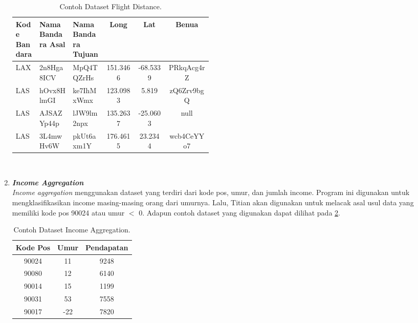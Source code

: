\begin{enumerate}
            \begin{longtable}{|p{0.12\linewidth}|p{0.17\linewidth}|p{0.17\linewidth}|c|c|c|}
                  \caption{Contoh Dataset Flight Distance.}
                  \label{tb:flightdistancedataset} \\
                  \hline
                  \rowcolor[HTML]{C0C0C0}
                  \raggedright{\textbf{Kode Bandara}} & \raggedright{\textbf{Nama Bandara Asal}} & \raggedright{\textbf{Nama Bandara Tujuan}} & \textbf{Long} & \textbf{Lat} & \textbf{Benua} \\
                  \hline
                  LAX & 2n8Hga8ICV & MpQ4TQZrHs & 151.3466 & -68.5339 & PRkqAcg4rZ \\
                  LAS & hOvx8HlmGI & ke7IhMxWmx & 123.0983 & 5.819 & zQ6Zrv9bgQ \\
                  LAS & AJSAZYp44p & lJW9lm2npx & 135.2637 & -25.0603 & null \\
                  LAS & 3L4mwHv6W & pkUt6axm1Y & 176.4615 & 23.2344 & wcb4CeYYo7 \\
                  \hline
            \end{longtable}
      
            \
      
      
            
      \item \emph{\textbf{Income Aggregation}} \\
            \emph{Income aggregation} menggunakan dataset yang terdiri dari kode pos, umur, dan jumlah income. Program ini digunakan untuk mengklasifikasikan income masing-masing orang dari umurnya. Lalu, Titian akan digunakan untuk melacak asal usul data yang memiliki kode pos 90024 atau umur $ < $ 0.
            Adapun contoh dataset yang digunakan dapat 
            dilihat pada \ref{tb:incomeaggregationdataset}.

            \begin{longtable}{|c|c|c|}
                  \caption{Contoh Dataset Income Aggregation.}
                  \label{tb:incomeaggregationdataset} \\
                  \hline
                  \rowcolor[HTML]{C0C0C0}
                  \textbf{Kode Pos} & \textbf{Umur} & \textbf{Pendapatan} \\
                  \hline
                  90024 & 11 & 9248 \\
                  90080 & 12 & 6140 \\
                  90014 & 15 & 1199 \\
                  90031 & 53 & 7558 \\
                  90017 & -22 & 7820 \\
                  \hline
            \end{longtable}


\end{enumerate}
